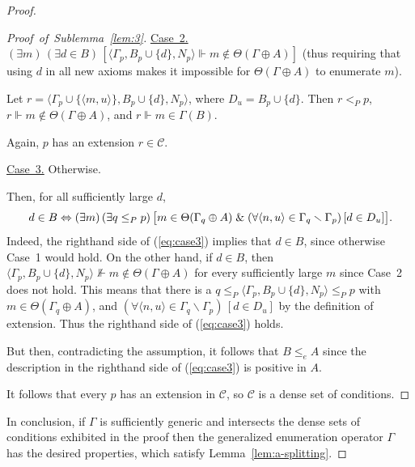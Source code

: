 \documentclass[10pt,a4paper]{amsart}
\newcommand{\QA}[1]{(\forall{#1})\,}
\newcommand{\QE}[1]{(\exists{#1})\,}
\begin{document}
\begin{proof}
\begin{proof}[Proof~of~Sublemma~\ref{lem:3}]
\underline{Case~2.} $\QE{m}\QE{d \in B}[ \langle \Gamma_p, B_p\cup \{d\}, 
N_p\rangle \Vdash m \notin \Theta(\Gamma \oplus A)]$ (thus requiring that 
using $d$ in all new axioms makes it impossible for $\Theta(\Gamma \oplus A)$ 
to enumerate $m$). 

Let $r=\langle \Gamma_p \cup \{\langle m, u \rangle\}, 
B_p\cup\{d\}, N_p \rangle$, where $D_u = B_p\cup \{d\}$. Then $r<_P p$, 
$r\Vdash m \notin \Theta(\Gamma 
\oplus A)$, and $r \Vdash m \in \Gamma(B)$. 

Again, $p$ has an extension $r \in \mathcal{C}$.

\underline{Case~3.} Otherwise. 

Then, for all sufficiently large $d$, 
\begin{equation}\label{eq:case3}
d \in B \Leftrightarrow\\
\QE{m}\QE{q \leq_P p}
\big[m \in \Theta (\Gamma_q \oplus A)\;\&\; \QA{\langle n, u\rangle \in 
\Gamma_q \smallsetminus \Gamma_p} 
    [d \in D_u]\big].
\end{equation}
Indeed, the righthand side of (\ref{eq:case3}) implies that $d\in B$, since 
otherwise Case~1 would hold. On the other hand, if $d \in B$, then 
$\langle\Gamma_p, B_p\cup \{d\}, N_p\rangle \nVdash m \notin \Theta(\Gamma 
\oplus A)$ for every sufficiently large $m$ since Case~2 does not hold. This 
means that there is a $q \leq_P \langle\Gamma_p, B_p\cup \{d\}, N_p\rangle 
\leq_P p$ with $m \in \Theta(\Gamma_q \oplus A)$, and $\QA{\langle n, 
u\rangle \in \Gamma_q \smallsetminus \Gamma_p}[d \in D_u]$ by the definition 
of extension.  Thus the righthand side of (\ref{eq:case3}) holds. 

But then, contradicting the assumption, it follows that $B\leq_e A$ since the 
description in the righthand side of (\ref{eq:case3}) is positive in $A$. 

It follows that every $p$ has an extension in $\mathcal{C}$, so $\mathcal{C}$ 
is a dense set of conditions. 
\end{proof}

In conclusion, if $\Gamma$ is sufficiently generic and intersects the dense 
sets of conditions exhibited in the proof then the generalized enumeration 
operator $\Gamma$ has the desired properties, which satisfy 
Lemma~\ref{lem:a-splitting}. 
\end{proof}
\end{document}
